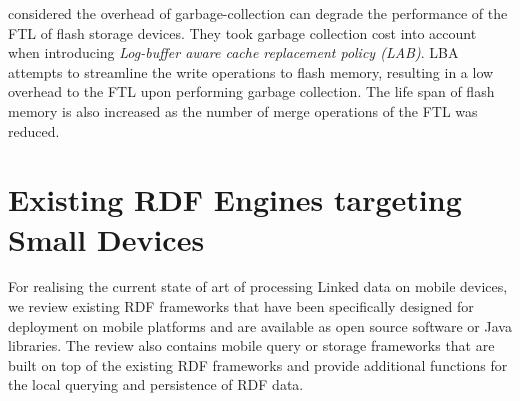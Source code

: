 \cite{Anwar:2017} considered the overhead of garbage-collection can degrade the performance of the FTL of flash storage devices.
They took garbage collection cost into account when introducing \textit{Log-buffer aware cache replacement policy (LAB)}.
LBA attempts to streamline the write operations to flash memory, resulting in a low overhead to the FTL upon performing garbage collection.
The life span of flash memory is also increased as the number of merge operations of the FTL was reduced.







\section{Existing RDF Engines targeting Small Devices}
For realising the current state of art of processing Linked data on mobile devices, we review existing RDF frameworks that have been specifically designed for deployment on mobile platforms and are available as open source software or Java libraries. The review also contains mobile query or storage frameworks that are built on top of the existing RDF frameworks and provide additional functions for the local querying and persistence of RDF data. 

